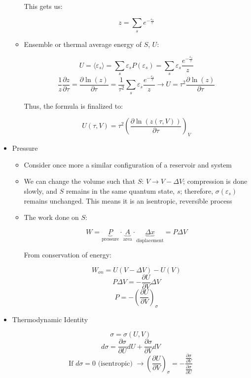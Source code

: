 \begin{itemize}
\begin{itemize}
        This gets us:

        $$\boxed{z=\sum_se^{-\frac{\varepsilon_s}{\tau}}}$$

      \item Ensemble or thermal average energy of $S$, $U$:

        $$U=\langle \varepsilon_s\rangle=\sum_s\varepsilon_sP(\varepsilon_s)=\sum_s \varepsilon_s\frac{e^{-\frac{\varepsilon_s}{\tau}}}{z}$$
        $$\frac{1}{z}\frac{\partial z}{\partial \tau}=\frac{\partial \ln(z)}{\partial \tau}=\frac{1}{\tau^2}\sum_s\varepsilon_s\frac{e^{-\frac{\varepsilon_s}{\tau}}}{z}\rightarrow U=\tau^2\frac{\partial \ln(z)}{\partial \tau}$$

        Thus, the formula is finalized to:

        $$\boxed{U(\tau, V)=\tau^2\left( \frac{\partial \ln(z(\tau,V))}{\partial \tau} \right)_V}$$

    \end{itemize}
    
  \item Pressure

    \begin{itemize}

      \item Consider once more a similar configuration of a reservoir and system

      \item We can change the volume such that $S:\, V\to V-\Delta V$; compression is done slowly, and $S$ remains in the same quantum state, $s$; therefore, $\sigma(\varepsilon_s)$ remains unchanged. This means it is an isentropic, reversible process

      \item The work done on $S$:

        $$W=\underbrace{P}_{\text{pressure}}\cdot \underbrace{A}_{\text{area}}\cdot \underbrace{\Delta x}_{\text{displacement}}=P\Delta V$$

        From conservation of energy:

        $$W_{on}=U(V-\Delta V)-U(V)$$
        $$P\Delta V=-\frac{\partial U}{\partial V}\Delta V$$
        $$P=-\left( \frac{\partial U}{\partial V} \right)_{\sigma}$$

    \end{itemize}

  \item Thermodynamic Identity

    $$\sigma=\sigma(U,V)$$
    $$d\sigma=\frac{\partial \sigma}{\partial U}dU+\frac{\partial \sigma}{\partial V}dV$$
    $$\text{If }d\sigma=0\text{ (isentropic) }\to\left(\frac{\partial U}{\partial V}\right)_{\sigma}=-\frac{\frac{\partial \sigma}{\partial V}}{\frac{\partial \sigma}{\partial U}}$$


\end{itemize}
